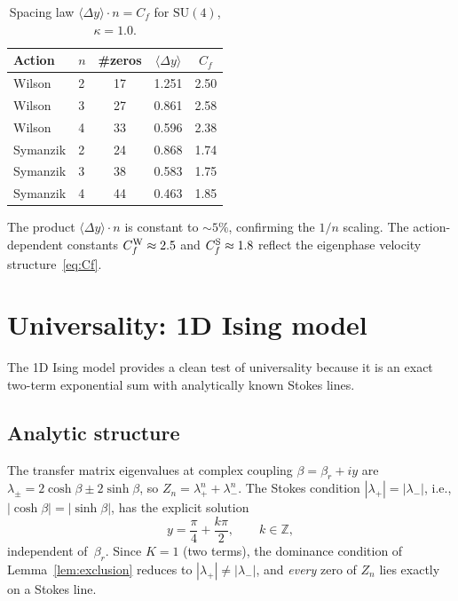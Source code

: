 \documentclass[12pt]{article}
\theoremstyle{definition}
\theoremstyle{remark}
\newcommand{\SU}{\mathrm{SU}}
\newcommand{\avg}[1]{\langle #1 \rangle}
\begin{document}
\begin{table}[h]
\centering
\caption{Spacing law $\avg{\Delta y} \cdot n = C_f$ for
  $\SU(4)$, $\kappa = 1.0$.}
\label{tab:scaling}
\begin{tabular}{llccc}
\toprule
Action & $n$ & \#zeros & $\avg{\Delta y}$ & $C_f$ \\
\midrule
Wilson   & 2 & 17 & 1.251 & 2.50 \\
Wilson   & 3 & 27 & 0.861 & 2.58 \\
Wilson   & 4 & 33 & 0.596 & 2.38 \\
\midrule
Symanzik & 2 & 24 & 0.868 & 1.74 \\
Symanzik & 3 & 38 & 0.583 & 1.75 \\
Symanzik & 4 & 44 & 0.463 & 1.85 \\
\bottomrule
\end{tabular}
\end{table}

The product $\avg{\Delta y} \cdot n$ is constant to ${\sim}5\%$,
confirming the $1/n$ scaling.  The action-dependent constants
$C_f^{\rm W} \approx 2.5$ and $C_f^{\rm S} \approx 1.8$ reflect
the eigenphase velocity structure~\eqref{eq:Cf}.


\section{Universality: 1D Ising model}
\label{sec:ising}

The 1D Ising model provides a clean test of universality because it
is an exact two-term exponential sum with analytically known Stokes
lines.

\subsection{Analytic structure}

The transfer matrix eigenvalues at complex coupling $\beta = \beta_r + iy$
are $\lambda_\pm = 2\cosh\beta \pm 2\sinh\beta$, so
$Z_n = \lambda_+^n + \lambda_-^n$.  The Stokes condition
$|\lambda_+| = |\lambda_-|$, i.e., $|\cosh\beta| = |\sinh\beta|$,
has the explicit solution
\begin{equation}\label{eq:ising_stokes}
y = \frac{\pi}{4} + \frac{k\pi}{2}, \qquad k \in \mathbb{Z},
\end{equation}
independent of~$\beta_r$.  Since $K = 1$ (two terms), the dominance
condition of Lemma~\ref{lem:exclusion} reduces to $|\lambda_+| \neq
|\lambda_-|$, and \emph{every} zero of $Z_n$ lies exactly on a Stokes
line.
\end{document}
